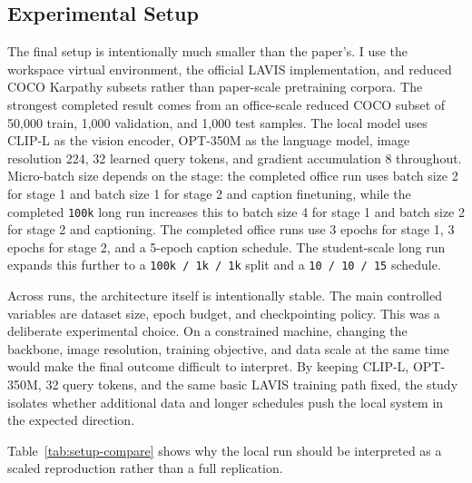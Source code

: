\documentclass[11pt]{article}
\begin{document}
\subsection{Experimental Setup}
The final setup is intentionally much smaller than the paper's. I use the workspace virtual environment, the official LAVIS implementation, and reduced COCO Karpathy subsets rather than paper-scale pretraining corpora. The strongest completed result comes from an office-scale reduced COCO subset of 50,000 train, 1,000 validation, and 1,000 test samples. The local model uses CLIP-L as the vision encoder, OPT-350M as the language model, image resolution 224, 32 learned query tokens, and gradient accumulation 8 throughout. Micro-batch size depends on the stage: the completed office run uses batch size 2 for stage 1 and batch size 1 for stage 2 and caption finetuning, while the completed \texttt{100k} long run increases this to batch size 4 for stage 1 and batch size 2 for stage 2 and captioning. The completed office runs use 3 epochs for stage 1, 3 epochs for stage 2, and a 5-epoch caption schedule. The student-scale long run expands this further to a \texttt{100k / 1k / 1k} split and a \texttt{10 / 10 / 15} schedule.

Across runs, the architecture itself is intentionally stable. The main controlled variables are dataset size, epoch budget, and checkpointing policy. This was a deliberate experimental choice. On a constrained machine, changing the backbone, image resolution, training objective, and data scale at the same time would make the final outcome difficult to interpret. By keeping CLIP-L, OPT-350M, 32 query tokens, and the same basic LAVIS training path fixed, the study isolates whether additional data and longer schedules push the local system in the expected direction.

Table~\ref{tab:setup-compare} shows why the local run should be interpreted as a scaled reproduction rather than a full replication.
\end{document}
